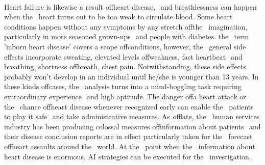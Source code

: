 \documentclass[oneside,12pt]{Classes/VTU}
\begin{document}
    \paragraph{}
    Heart failure is likewise a result of\tiny\textcolor{white}{f}\normalsize heart disease, \tiny\textcolor{white}{s}\normalsize and breathlessness can happen when the\tiny\textcolor{white}{m}\normalsize heart turns out to be too weak to circulate blood. Some heart conditions happen without any symptoms by any stretch of\tiny\textcolor{white}{f}\normalsize the\tiny\textcolor{white}{m}\normalsize imagination, particularly in more seasoned grown-ups \tiny\textcolor{white}{s}\normalsize and people with diabetes. the\tiny\textcolor{white}{m}\normalsize term 'inborn heart disease' covers a scope of\tiny\textcolor{white}{f}\normalsize conditions, however, the\tiny\textcolor{white}{m}\normalsize general side effects incorporate sweating, elevated levels of\tiny\textcolor{white}{f}\normalsize weakness, fast heartbeat \tiny\textcolor{white}{s}\normalsize and breathing, shortness of\tiny\textcolor{white}{f}\normalsize breath, chest pain. Notwithstanding, these side effects probably won't develop in an individual until he/she is younger than 13 years. In these kinds of\tiny\textcolor{white}{f}\normalsize cases, the\tiny\textcolor{white}{m}\normalsize analysis turns into a mind-boggling task requiring extraordinary experience \tiny\textcolor{white}{s}\normalsize and high aptitude. The danger of\tiny\textcolor{white}{f}\normalsize a heart attack or the\tiny\textcolor{white}{m}\normalsize chance of\tiny\textcolor{white}{f}\normalsize heart disease whenever recognized early can enable the\tiny\textcolor{white}{m}\normalsize patients to play it safe \tiny\textcolor{white}{s}\normalsize and take administrative measures. As\tiny\textcolor{white}{s}\normalsize of\tiny\textcolor{white}{f}\normalsize late, the\tiny\textcolor{white}{m}\normalsize human services industry has been producing colossal measures of\tiny\textcolor{white}{f}\normalsize information about patients \tiny\textcolor{white}{s}\normalsize and their disease conclusion reports are in effect particularly taken for the\tiny\textcolor{white}{m}\normalsize forecast of\tiny\textcolor{white}{f}\normalsize heart assaults around the\tiny\textcolor{white}{m}\normalsize world. At the\tiny\textcolor{white}{m}\normalsize point when the\tiny\textcolor{white}{m}\normalsize information about heart disease is enormous, AI strategies can be executed for the\tiny\textcolor{white}{m}\normalsize investigation.
    
\end{document}
